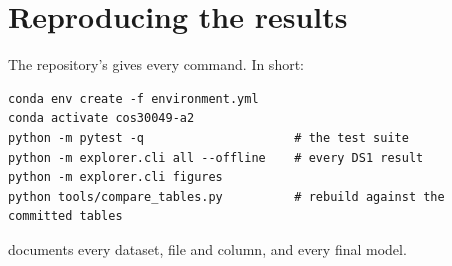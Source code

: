 \section{Reproducing the results}
\label{app:repro}

The repository's  gives every command. In short:
\begin{verbatim}
conda env create -f environment.yml
conda activate cos30049-a2
python -m pytest -q                     # the test suite
python -m explorer.cli all --offline    # every DS1 result
python -m explorer.cli figures
python tools/compare_tables.py          # rebuild against the committed tables
\end{verbatim}
 documents every dataset, file and column, and  every final model.

